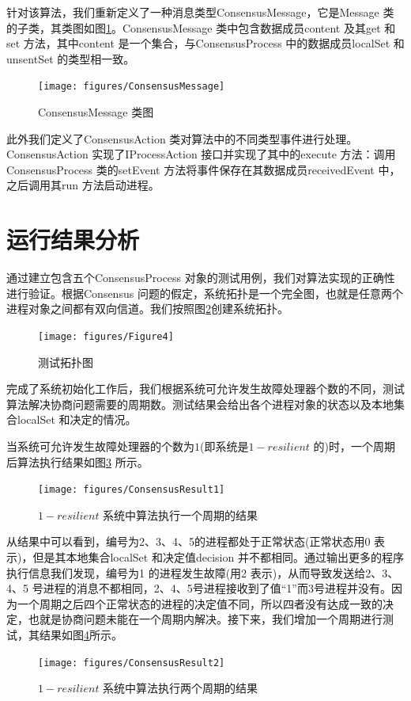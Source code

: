     针对该算法，我们重新定义了一种消息类型ConsensusMessage，它是Message 类的子类，其类图如图\ref{ConsensusMessage}。ConsensusMessage 类中包含数据成员content 及其get 和set 方法，其中content 是一个集合，与ConsensusProcess 中的数据成员localSet 和unsentSet 的类型相一致。
    \begin{figure}[ht]
        \centering
        \texttt{[image: figures/ConsensusMessage]}\\
        \caption{ConsensusMessage 类图}\label{ConsensusMessage}
    \end{figure}

    此外我们定义了ConsensusAction 类对算法中的不同类型事件进行处理。ConsensusAction 实现了IProcessAction 接口并实现了其中的execute 方法：调用ConsensusProcess 类的setEvent 方法将事件保存在其数据成员receivedEvent 中，之后调用其run 方法启动进程。

    \section{运行结果分析}
    通过建立包含五个ConsensusProcess 对象的测试用例，我们对算法实现的正确性进行验证。根据Consensus 问题的假定，系统拓扑是一个完全图，也就是任意两个进程对象之间都有双向信道。我们按照图\ref{Figure4}创建系统拓扑。
    \begin{figure}[ht]
        \centering
        \texttt{[image: figures/Figure4]}\\
        \caption{测试拓扑图}\label{Figure4}
    \end{figure}

    完成了系统初始化工作后，我们根据系统可允许发生故障处理器个数的不同，测试算法解决协商问题需要的周期数。测试结果会给出各个进程对象的状态以及本地集合localSet 和决定的情况。

    当系统可允许发生故障处理器的个数为$1$(即系统是$1-resilient$ 的)时，一个周期后算法执行结果如图\ref{ConsensusResult1} 所示。

    \begin{figure}[ht]
        \centering
        \texttt{[image: figures/ConsensusResult1]}\\
        \caption{$1-resilient$ 系统中算法执行一个周期的结果}\label{ConsensusResult1}
    \end{figure}

    从结果中可以看到，编号为2、3、4、5的进程都处于正常状态(正常状态用0 表示)，但是其本地集合localSet 和决定值decision 并不都相同。通过输出更多的程序执行信息我们发现，编号为1 的进程发生故障(用2 表示)，从而导致发送给2、3、4、5 号进程的消息不都相同，2、4、5号进程接收到了值“1”而3号进程并没有。因为一个周期之后四个正常状态的进程的决定值不同，所以四者没有达成一致的决定，也就是协商问题未能在一个周期内解决。接下来，我们增加一个周期进行测试，其结果如图\ref{ConsensusResult2}所示。
    \begin{figure}[ht]
        \centering
        \texttt{[image: figures/ConsensusResult2]}\\
        \caption{$1-resilient$ 系统中算法执行两个周期的结果}\label{ConsensusResult2}
    \end{figure}

